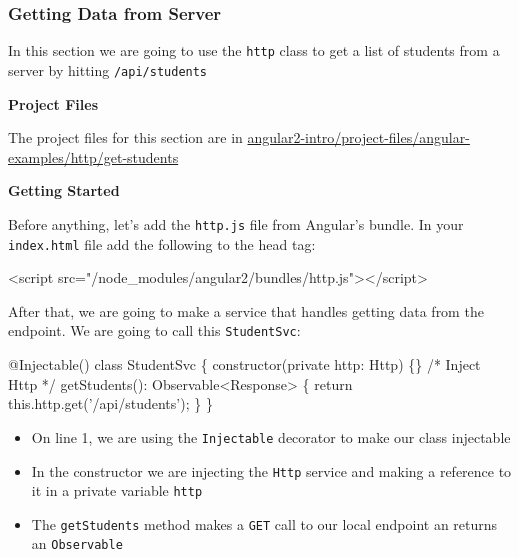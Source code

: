 \documentclass[12pt,]{article}
\newenvironment{Shaded}{}{}
\newcommand{\KeywordTok}[1]{\textcolor[rgb]{0.00,0.00,1.00}{{#1}}}
\newcommand{\StringTok}[1]{\textcolor[rgb]{0.00,0.50,0.50}{{#1}}}
\newcommand{\CommentTok}[1]{\textcolor[rgb]{0.00,0.50,0.00}{{#1}}}
\newcommand{\OtherTok}[1]{\textcolor[rgb]{1.00,0.25,0.00}{{#1}}}
\newcommand{\FunctionTok}[1]{{#1}}
\newcommand{\NormalTok}[1]{{#1}}
\providecommand{\tightlist}{%
  \setlength{\itemsep}{0pt}\setlength{\parskip}{0pt}}
\begin{document}
\subsubsection{Getting Data from Server}\label{getting-data-from-server}

In this section we are going to use the \texttt{http} class to get a
list of students from a server by hitting \texttt{/api/students}

\textbf{Project Files}

The project files for this section are in
\href{https://github.com/aminmeyghani/angular2-intro/tree/master/project-files/angular-examples/http/get-students}{angular2-intro/project-files/angular-examples/http/get-students}

\textbf{Getting Started}

Before anything, let's add the \texttt{http.js} file from Angular's
bundle. In your \texttt{index.html} file add the following to the head
tag:

\begin{Shaded}
\begin{Highlighting}[numbers=left,,]
\KeywordTok{<script}\OtherTok{ src=}\StringTok{"/node_modules/angular2/bundles/http.js"}\KeywordTok{></script>}
\end{Highlighting}
\end{Shaded}

After that, we are going to make a service that handles getting data
from the endpoint. We are going to call this \texttt{StudentSvc}:

\begin{Shaded}
\begin{Highlighting}[numbers=left,,]
\FunctionTok{@Injectable}\NormalTok{()}
\KeywordTok{class} \NormalTok{StudentSvc \{}
  \FunctionTok{constructor}\NormalTok{(}\KeywordTok{private} \NormalTok{http: Http) \{\} }\CommentTok{/* Inject Http */}
  \FunctionTok{getStudents}\NormalTok{(): Observable<Response> \{}
    \KeywordTok{return} \KeywordTok{this}\NormalTok{.}\FunctionTok{http}\NormalTok{.}\FunctionTok{get}\NormalTok{('/api/students');}
  \NormalTok{\}}
\NormalTok{\}}
\end{Highlighting}
\end{Shaded}

\begin{itemize}
\tightlist
\item
  On line 1, we are using the \texttt{Injectable} decorator to make our
  class injectable
\item
  In the constructor we are injecting the \texttt{Http} service and
  making a reference to it in a private variable \texttt{http}
\item
  The \texttt{getStudents} method makes a \texttt{GET} call to our local
  endpoint an returns an \texttt{Observable}
\end{itemize}
\end{document}

